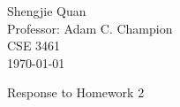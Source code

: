\documentclass[12pt]{article}
\title{}
\author{}
\date{}                                           %
\begin{document}
\begin{flushleft}
Shengjie Quan\\
Professor: Adam C. Champion\\
CSE 3461	 \\
\today \\
\end{flushleft}

\begin{center}
Response to Homework 2
\end{center}

\setlength{\parindent}{0.5in}

\begin{singlespace}

\begin{enumerate}


\end{enumerate}
\end{singlespace}
\end{document}
